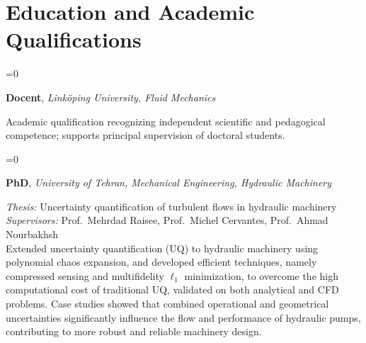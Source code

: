 \renewcommand{\cventrysep}{0.95em}
\providecommand{\cventrysep}{0.95em}
\providecommand{\cvfirstentry}{1}
\providecommand{\cventry}[3]{%
  \ifnum\cvfirstentry=0 \par\addvspace{\cventrysep}\fi
  \gdef\cvfirstentry{0}%
  \par\noindent
  \parbox[t]{\dimexpr\linewidth-8.5em\relax}{\raggedright\textbf{#1}, \textit{#2}}%
  \hfill\makebox[8em][r]{\footnotesize\color{black!60}#3}%
  \par\nobreak\vspace{0.1em}}
\ifdefined\cvbody\else
  \newenvironment{cvbody}
    {\begin{list}{}{\setlength{\leftmargin}{1.2em}\setlength{\rightmargin}{0mm}%
       \setlength{\topsep}{0.1em}\setlength{\parsep}{0pt}\setlength{\itemsep}{0pt}}%
     \item[]}
    {\end{list}}
\fi

\newpage
\section{Education and Academic Qualifications}{}
\gdef\cvfirstentry{1}
\renewcommand{\cventrysep}{2.4em}

\cventry{Docent}{Linköping University, Fluid Mechanics}{Feb. 2026}
\begin{cvbody}
Academic qualification recognizing independent scientific and pedagogical competence; supports principal supervision of doctoral students.
\end{cvbody}

\cventry{PhD}{University of Tehran, Mechanical Engineering, Hydraulic Machinery}{2012 -- 2018}
\begin{cvbody}
\textit{Thesis:} Uncertainty quantification of turbulent flows in hydraulic machinery\\
\textit{Supervisors:} Prof.\ Mehrdad Raisee, Prof.\ Michel Cervantes, Prof.\ Ahmad Nourbakhsh\\
Extended uncertainty quantification (UQ) to hydraulic machinery using polynomial chaos expansion, and developed efficient techniques, namely compressed sensing and multifidelity $\ell_1$ minimization, to overcome the high computational cost of traditional UQ, validated on both analytical and CFD problems. Case studies showed that combined operational and geometrical uncertainties significantly influence the flow and performance of hydraulic pumps, contributing to more robust and reliable machinery design.
\end{cvbody}

